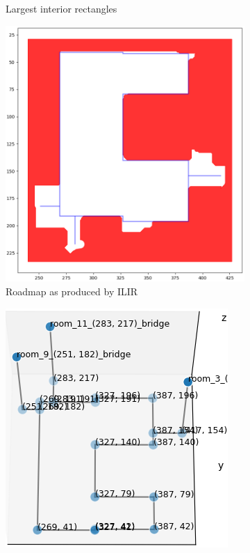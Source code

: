 \begin{figure}[h]
\begin{subfigure}{.25\textwidth}
      \caption{Largest interior rectangles}
    \end{subfigure}%
    \begin{subfigure}{.25\textwidth}
      \centering
      \includegraphics[width=\textwidth]{figures/50_implementation/ryu_room2_roadmap.png}
      \caption{Roadmap as produced by ILIR}
    \end{subfigure}%
    \begin{subfigure}{.25\textwidth}
      \centering
      \includegraphics[width=\textwidth]{figures/50_implementation/ryu_room2_roadmap_graph.png}

\end{subfigure}
\end{figure}
